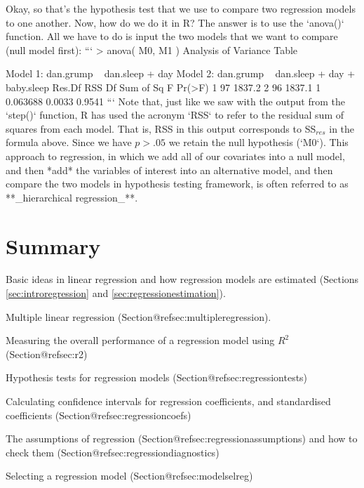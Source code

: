 Okay, so that's the hypothesis test that we use to compare two regression models to one another. Now, how do we do it in R? The answer is to use the `anova()` function. All we have to do is input the two models that we want to compare (null model first):
```
> anova( M0, M1 )
Analysis of Variance Table

Model 1: dan.grump ~ dan.sleep + day
Model 2: dan.grump ~ dan.sleep + day + baby.sleep
  Res.Df    RSS Df Sum of Sq      F Pr(>F)
1     97 1837.2                           
2     96 1837.1  1  0.063688 0.0033 0.9541
```
Note that, just like we saw with the output from the `step()` function, R has used the acronym `RSS` to refer to the residual sum of squares from each model. That is, RSS in this output corresponds to SS$_{res}$ in the formula above.  Since we have $p>.05$ we retain the null hypothesis (`M0`).  This approach to regression, in which we add all of our covariates into a null model, and then *add* the variables of interest into an alternative model, and then compare the two models in hypothesis testing framework, is often referred to as **_hierarchical regression_**.

\section{Summary}

 \itemsep -2pt
\item Basic ideas in linear regression and how regression models are estimated (Sections \ref{sec:introregression} and \ref{sec:regressionestimation}).
\item Multiple linear regression (Section@refsec:multipleregression). 
\item Measuring the overall performance of a regression model using $R^2$ (Section@refsec:r2)
\item Hypothesis tests for regression models (Section@refsec:regressiontests)
\item Calculating confidence intervals for regression coefficients, and standardised coefficients (Section@refsec:regressioncoefs)
\item The assumptions of regression (Section@refsec:regressionassumptions) and how to check them (Section@refsec:regressiondiagnostics)
\item Selecting a regression model (Section@refsec:modelselreg)
